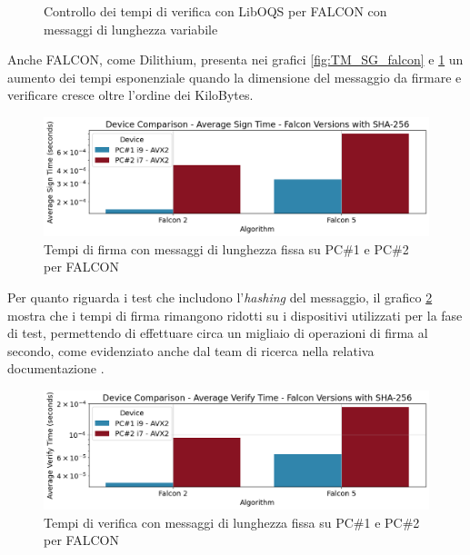 \begin{figure}[H]
\begin{minipage}{0.45\textwidth}
        \caption{Controllo dei tempi di verifica con LibOQS per FALCON con messaggi di lunghezza variabile}
        \label{fig:TM_VF_falcon}
    \end{minipage}
\end{figure}

Anche FALCON, come Dilithium, presenta nei grafici \ref{fig:TM_SG_falcon} e \ref{fig:TM_VF_falcon} un aumento dei tempi esponenziale quando la dimensione del messaggio da firmare e verificare cresce oltre l'ordine dei KiloBytes.

\begin{figure}[H]
    \centering
    \includegraphics[width=1\textwidth]{Immagini/comparison/Time_Sign/TM_SG_H_falcon_sha256.png}
    \caption{Tempi di firma con messaggi di lunghezza fissa su PC\#1 e PC\#2 per FALCON}
    \label{fig:TM_SG_H_falcon_sha256}
\end{figure}

Per quanto riguarda i test che includono l'\textit{hashing} del messaggio, il grafico \ref{fig:TM_SG_H_falcon_sha256} mostra che i tempi di firma rimangono ridotti su i dispositivi utilizzati per la fase di test, permettendo di effettuare circa un migliaio di operazioni di firma al secondo, come evidenziato anche dal team di ricerca nella relativa documentazione \cite{falcon-submissionpackage-three}.

\begin{figure}[H]
    \centering
    \includegraphics[width=1\textwidth]{Immagini/comparison/Time_Verify/TM_VF_H_falcon_sha256.png}
    \caption{Tempi di verifica con messaggi di lunghezza fissa su PC\#1 e PC\#2 per FALCON}
    \label{fig:TM_VF_H_falcon_sha256}
\end{figure}

